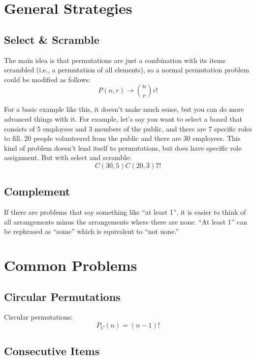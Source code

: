 \documentclass{article}
\begin{document}
    \section{General Strategies}

    \subsection{Select \& Scramble}

    The main idea is that permutations are just a combination with its items scrambled (i.e., a permutation of all elements), so a normal permutation problem could be modified as follows: $$
        P(n, r) \to {n \choose r}r!
    $$

    For a basic example like this, it doesn't make much sense, but you can do more advanced things with it. For example, let's say you want to select a board that consists of 5 employees and 3 members of the public, and there are 7 specific roles to fill. 20 people volunteered from the public and there are 30 employees. This kind of problem doesn't lend itself to permutations, but does have specific role assignment. But with select and scramble: $$
        C(30, 5)C(20, 3)7!
    $$

    \subsection{Complement}

    If there are problems that say something like ``at least 1'', it is easier to think of all arrangements minus the arrangements where there are none. ``At least 1'' can be rephrased as ``some'' which is equivalent to ``not none.''

    \section{Common Problems}

    \subsection{Circular Permutations}

    Circular permutations: \begin{equation}
        P_C(n) = (n - 1)!
    \end{equation}

    \subsection{Consecutive Items}
\end{document}
